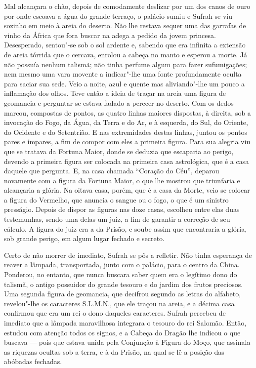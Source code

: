 Mal alcançara o chão, depois de comodamente deslizar por um dos canos de
ouro por onde escoava a água do grande terraço, o palácio sumiu e Sufrah
se viu sozinho em meio à areia do deserto. Não lhe restava sequer uma das
garrafas de vinho da África que fora buscar na adega a pedido da jovem
princesa. Desesperado, sentou"-se sob o sol ardente e, sabendo que era
infinita a extensão de areia tórrida que o cercava, enrolou a cabeça no
manto e esperou a morte. Já não possuía nenhum talismã; não tinha perfume
algum para fazer sufumigações; nem mesmo uma vara movente a indicar"-lhe
uma fonte profundamente oculta para saciar sua sede. Veio a noite, azul e
quente mas aliviando"-lhe um pouco a inflamação dos olhos. Teve então a
ideia de traçar na areia uma figura de geomancia e perguntar se estava
fadado a perecer no deserto. Com os dedos marcou, compostas de pontos, as
quatro linhas maiores dispostas, à direita, sob a invocação do Fogo, da
Água, da Terra e do Ar, e à esquerda, do Sul, do Oriente, do Ocidente e do
Setentrião. E nas extremidades destas linhas, juntou os pontos pares e
ímpares, a fim de compor com eles a primeira figura. Para sua alegria viu
que se tratava da Fortuna Maior, donde se deduzia que escaparia ao perigo,
devendo a primeira figura ser colocada na primeira casa astrológica, que é
a casa daquele que pergunta. E, na casa chamada “Coração do Céu”, deparou
novamente com a figura da Fortuna Maior, o que lhe mostrou que triunfaria
e alcançaria a glória. Na oitava casa, porém, que é a casa da Morte, veio
se colocar a figura do Vermelho, que anuncia o sangue ou o fogo, o que é
um sinistro presságio. Depois de dispor as figuras nas doze casas,
escolheu entre elas duas testemunhas, sendo uma delas um juiz, a fim de
garantir a correção de seu cálculo. A figura do juiz era a da Prisão, e
soube assim que encontraria a glória, sob grande perigo, em algum lugar
fechado e secreto.

Certo de não morrer de imediato, Sufrah se pôs a refletir. Não tinha
esperança de reaver a lâmpada, transportada, junto com o palácio, para o
centro da China. Ponderou, no entanto, que nunca buscara saber quem era o
legítimo dono do talismã, o antigo possuidor do grande tesouro e do jardim
dos frutos preciosos. Uma segunda figura de geomancia, que decifrou
segundo as letras do alfabeto, revelou"-lhe os caracteres S.L.M.N., que ele
traçou na areia, e a décima casa confirmou que era um rei o dono daqueles
caracteres. Sufrah percebeu de imediato que a lâmpada maravilhosa
integrara o tesouro do rei Salomão. Então, estudou com atenção todos os
signos, e a Cabeça do Dragão lhe indicou o que buscava --- pois que estava
unida pela Conjunção à Figura do Moço, que assinala as riquezas ocultas
sob a terra, e à da Prisão, na qual se lê a posição das abóbadas fechadas.

